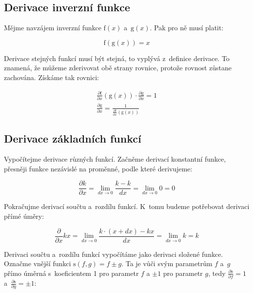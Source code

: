 \subsection{Derivace inverzní funkce}

Mějme navzájem inverzní funkce \(\mathrm{f}(x)\) a~\(\mathrm{g}(x)\). Pak pro ně musí platit:

\begin{equation}
\mathrm{f}(\mathrm{g}(x)) = x
\end{equation}

Derivace stejných funkcí musí být stejná, to vyplývá z~definice derivace. To znamená, že můžeme zderivovat obě strany rovnice, protože rovnost zůstane zachována. Získáme tak rovnici:

\begin{equation}
\label{eq:derivace_inverzni_funkce}
\begin{split}
\frac{\partial \mathrm{f}}{\partial x}(\mathrm{g}(x)) \cdot \frac{\partial \mathrm{g}}{\partial x} = 1 \\
\frac{\partial \mathrm{g}}{\partial x} = \frac{1}{\frac{\partial \mathrm{f}}{\partial x}(\mathrm{g}(x))}
\end{split}
\end{equation}

\subsection{Derivace základních funkcí}
\label{sec:derivace_zakladnich_funkci}

Vypočítejme derivace různých funkcí. Začněme derivací konstantní funkce, přesněji funkce nezávislé na proměnné, podle které derivujeme:

\begin{equation}
\frac{\partial k}{\partial x} = \lim_{dx \to 0} \frac{k - k}{dx} = \lim_{dx \to 0} 0 = 0
\end{equation}

Pokračujme derivací součtu a~rozdílu funkcí. K~tomu budeme potřebovat derivaci přímé úměry:

\begin{equation}
\frac{\partial}{\partial x} kx = \lim_{dx \to 0} \frac{k \cdot (x + dx) - kx}{dx} = \lim_{dx \to 0} k = k
\end{equation}

Derivaci součtu a~rozdílu funkcí vypočítáme jako derivaci složené funkce. Označme vnější funkci \(\mathrm{s}(f, g) = f \pm g\). Ta je vůči svým parametrům \(f\) a~\(g\) přímo úměrná s~koeficientem 1 pro parametr \(f\) a \(\pm1\) pro parametr \(g\), tedy \(\frac{\partial \mathrm{s}}{\partial f} = 1\) a~\(\frac{\partial \mathrm{s}}{\partial g} = \pm1\):

